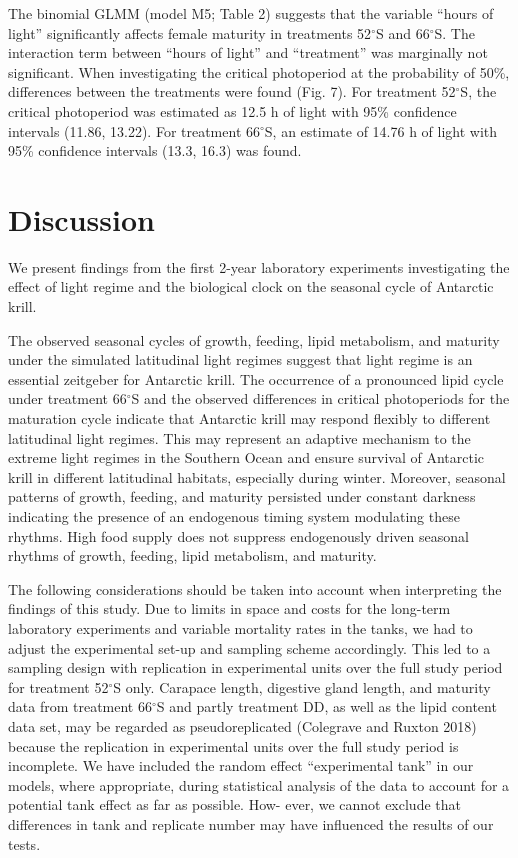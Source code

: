 The binomial GLMM (model M5; Table 2) suggests that the variable “hours of
light” significantly affects female maturity in treatments 52$^{\circ}$S and
66$^{\circ}$S. The interaction term between “hours of light” and “treatment”
was marginally not significant. When investigating the critical photoperiod at
the probability of 50\%, differences between the treatments were found (Fig.
7). For treatment 52$^{\circ}$S, the critical photoperiod was estimated as 12.5
h of light with 95\% confidence intervals (11.86, 13.22). For treatment
66$^{\circ}$S, an estimate of 14.76 h of light with 95\% confidence intervals
(13.3, 16.3) was found.

\section{Discussion}

We present findings from the first 2-year laboratory experiments investigating
the effect of light regime and the biological clock on the seasonal cycle of
Antarctic krill. 

The observed seasonal cycles of growth, feeding, lipid metabolism, and maturity
under the simulated latitudinal light regimes suggest that light regime is an
essential zeitgeber for Antarctic krill. The occurrence of a pronounced lipid
cycle under treatment 66$^{\circ}$S and the observed differences in critical
photoperiods for the maturation cycle indicate that Antarctic krill may respond
flexibly to different latitudinal light regimes. This may represent an adaptive
mechanism to the extreme light regimes in the Southern Ocean and ensure
survival of Antarctic krill in different latitudinal habitats, especially
during winter. Moreover, seasonal patterns of growth, feeding, and maturity
persisted under constant darkness indicating the presence of an endogenous
timing system modulating these rhythms. High food supply does not suppress
endogenously driven seasonal rhythms of growth, feeding, lipid metabolism, and
maturity. 

The following considerations should be taken into account when interpreting the
findings of this study. Due to limits in space and costs for the long-term
laboratory experiments and variable mortality rates in the tanks, we had to
adjust the experimental set-up and sampling scheme accordingly. This led to a
sampling design with replication in experimental units over the full study
period for treatment 52$^{\circ}$S only. Carapace length, digestive gland
length, and maturity data from treatment 66$^{\circ}$S and partly treatment DD,
as well as the lipid content data set, may be regarded as pseudoreplicated
(Colegrave and Ruxton 2018) because the replication in experimental units over
the full study period is incomplete. We have included the random effect
“experimental tank” in our models, where appropriate, during statistical
analysis of the data to account for a potential tank effect as far as possible.
How- ever, we cannot exclude that differences in tank and replicate number may
have influenced the results of our tests. 

